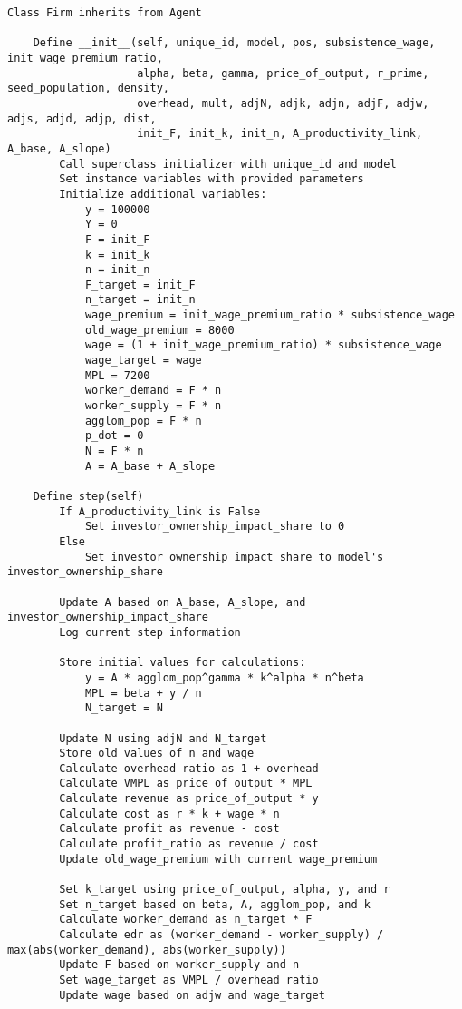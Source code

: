 {\small\begin{verbatim} 
Class Firm inherits from Agent

    Define __init__(self, unique_id, model, pos, subsistence_wage, init_wage_premium_ratio, 
                    alpha, beta, gamma, price_of_output, r_prime, seed_population, density, 
                    overhead, mult, adjN, adjk, adjn, adjF, adjw, adjs, adjd, adjp, dist, 
                    init_F, init_k, init_n, A_productivity_link, A_base, A_slope)
        Call superclass initializer with unique_id and model
        Set instance variables with provided parameters
        Initialize additional variables:
            y = 100000
            Y = 0
            F = init_F
            k = init_k
            n = init_n
            F_target = init_F
            n_target = init_n
            wage_premium = init_wage_premium_ratio * subsistence_wage
            old_wage_premium = 8000
            wage = (1 + init_wage_premium_ratio) * subsistence_wage
            wage_target = wage
            MPL = 7200
            worker_demand = F * n
            worker_supply = F * n
            agglom_pop = F * n
            p_dot = 0
            N = F * n
            A = A_base + A_slope

    Define step(self)
        If A_productivity_link is False
            Set investor_ownership_impact_share to 0
        Else
            Set investor_ownership_impact_share to model's investor_ownership_share
        
        Update A based on A_base, A_slope, and investor_ownership_impact_share
        Log current step information
        
        Store initial values for calculations:
            y = A * agglom_pop^gamma * k^alpha * n^beta
            MPL = beta + y / n
            N_target = N
        
        Update N using adjN and N_target
        Store old values of n and wage
        Calculate overhead ratio as 1 + overhead
        Calculate VMPL as price_of_output * MPL
        Calculate revenue as price_of_output * y
        Calculate cost as r * k + wage * n
        Calculate profit as revenue - cost
        Calculate profit_ratio as revenue / cost
        Update old_wage_premium with current wage_premium
        
        Set k_target using price_of_output, alpha, y, and r
        Set n_target based on beta, A, agglom_pop, and k
        Calculate worker_demand as n_target * F
        Calculate edr as (worker_demand - worker_supply) / max(abs(worker_demand), abs(worker_supply))
        Update F based on worker_supply and n
        Set wage_target as VMPL / overhead ratio
        Update wage based on adjw and wage_target
        

\end{verbatim}}
